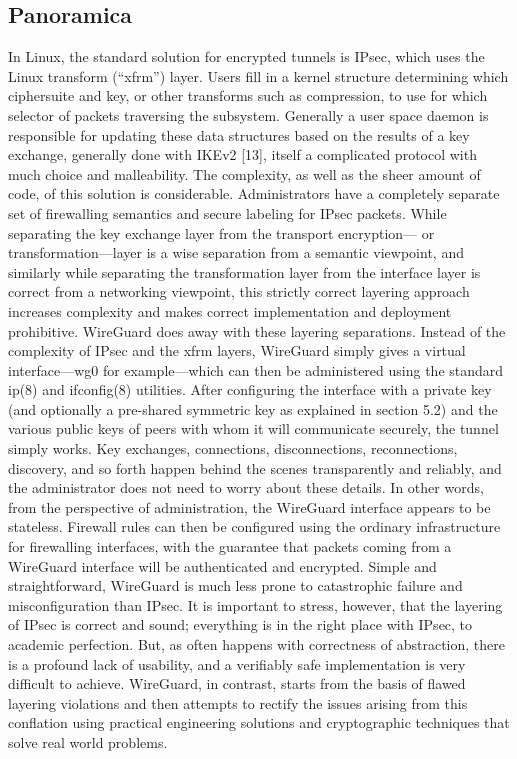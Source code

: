 \subsection{Panoramica}
In Linux, the standard solution for encrypted tunnels is IPsec, which uses the Linux transform (“xfrm”) layer. Users fill in a kernel structure determining which ciphersuite and key, or other transforms such as compression, to use for which selector of packets traversing the subsystem. Generally a user space daemon is responsible for updating these data structures based on the results of a key exchange, generally done with IKEv2 [13], itself a complicated protocol with much choice and malleability. The complexity, as well as the sheer amount of code, of this solution is considerable. Administrators have a completely separate set of firewalling semantics and secure labeling for IPsec packets. While separating the key exchange layer from the transport encryption— or transformation—layer is a wise separation from a semantic viewpoint, and similarly while separating the transformation layer from the interface layer is correct from a networking viewpoint, this strictly correct layering approach increases complexity and makes correct implementation and deployment prohibitive.
WireGuard does away with these layering separations. Instead of the complexity of IPsec and the xfrm layers, WireGuard simply gives a virtual interface—wg0 for example—which can then be administered using the standard ip(8) and ifconfig(8) utilities. After configuring the interface with a private key (and optionally a pre-shared symmetric key as explained in section 5.2) and the various public keys of peers with whom it will communicate securely, the tunnel simply works. Key exchanges, connections, disconnections, reconnections, discovery, and so forth happen behind the scenes transparently and reliably, and the administrator does not need to worry about these details. In other words, from the perspective of administration, the WireGuard interface appears to be stateless. Firewall rules can then be configured using the ordinary infrastructure for firewalling interfaces, with the guarantee that packets coming from a WireGuard interface will be authenticated and encrypted. Simple and straightforward, WireGuard is much less prone to catastrophic failure and misconfiguration than IPsec. It is important to stress, however, that the layering of IPsec is correct and sound; everything is in the right place with IPsec, to academic perfection. But, as often happens with correctness of abstraction, there is a profound lack of usability, and a verifiably safe implementation is very difficult to achieve. WireGuard, in contrast, starts from the basis of flawed layering violations and then attempts to rectify the issues arising from this conflation using practical engineering solutions and cryptographic techniques that solve real world problems.

